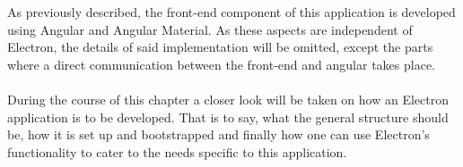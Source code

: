 
As previously described, the front-end component of this application is developed using Angular and Angular Material.
As these aspects are independent of Electron, the details of said implementation will be omitted, except the parts
where a direct communication between the front-end and angular takes place.\paragraph{}
During the course of this chapter a closer look will be taken on how an Electron application is to be developed.
That is to say, what the general structure should be, how it is set up and bootstrapped and finally how one can 
use Electron's functionality to cater to the needs specific to this application. 
